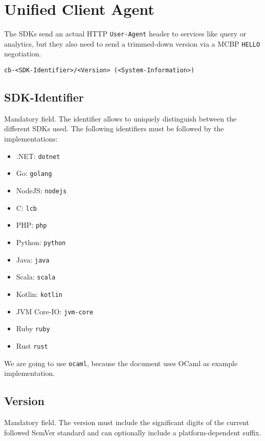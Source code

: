 \documentclass{report}
\begin{document}
\section{Unified Client Agent}

The SDKs send an actual HTTP \texttt{User-Agent} header to services like query or analytics, but they also need to send a
trimmed-down version via a MCBP \texttt{HELLO} negotiation.

\begin{verbatim}
cb-<SDK-Identifier>/<Version> (<System-Information>)
\end{verbatim}

\subsection{SDK-Identifier}

Mandatory field. The identifier allows to uniquely distinguish between the different SDKs used. The following identifiers must be
followed by the implementations:

\begin{itemize}
    \item .NET: \texttt{dotnet}
    \item Go: \texttt{golang}
    \item NodeJS: \texttt{nodejs}
    \item C: \texttt{lcb}
    \item PHP: \texttt{php}
    \item Python: \texttt{python}
    \item Java: \texttt{java}
    \item Scala: \texttt{scala}
    \item Kotlin: \texttt{kotlin}
    \item JVM Core-IO: \texttt{jvm-core}
    \item Ruby \texttt{ruby}
    \item Rust \texttt{rust}
\end{itemize}

We are going to use \texttt{ocaml}, because the document uses OCaml as example implementation.

\subsection{Version}

Mandatory field. The version must include the significant digits of the current followed SemVer standard and can
optionally include a platform-dependent suffix.
\end{document}
